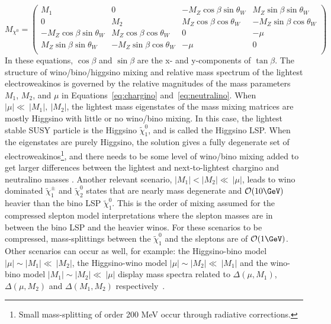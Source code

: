 \begin{equation}
M_{\chi^0}=
\begin{pmatrix}
M_1 & 0 & -M_Z\cos\beta \sin\theta_W & M_Z\sin\beta \sin\theta_W\\
0 & M_2 & M_Z\cos\beta \cos\theta_W & -M_Z\sin\beta \cos\theta_W\\
-M_Z\cos\beta \sin\theta_W & M_Z\cos\beta \cos\theta_W & 0 & -\mu \\
M_Z\sin\beta \sin\theta_W & -M_Z\sin\beta \cos\theta_W & -\mu & 0 \\
\end{pmatrix}
\label{eq:neutralino}
\end{equation}
In these equations, $\cos\beta$ and $\sin\beta$ are the x- and y-components of $\tan\beta$.  The structure of wino/bino/higgsino mixing and relative mass spectrum of the lightest electroweakinos is governed by the relative magnitudes of the mass parameters $M_1$, $M_2$, and $\mu$ in Equations~\ref{eq:chargino} and~\ref{eq:neutralino}.  When $|\mu|\ll~|M_1|,~|M_2|$, the lightest mass eigenstates of the mass mixing matrices are mostly Higgsino with little or no wino/bino mixing.  In this case, the lightest stable SUSY particle is the Higgsino $\tilde\chi_1^0$, and is called the Higgsino LSP.  When the eigenstates are purely Higgsino, the solution gives a fully degenerate set of electroweakinos\footnote{Small mass-splitting of order 200 MeV occur through radiative corrections.}, and there needs to be some level of wino/bino mixing added to get larger differences between the lightest and next-to-lightest chargino and neutralino masses \cite{PhysRevD.93.063525}.  Another relevant scenario, $|M_1| <|M_2|\ll~|\mu|$, leads to wino dominated $\tilde\chi_1^\pm$ and $\tilde\chi_2^0$ states that are nearly mass degenerate and $\mathcal{O}(10\GeV)$ heavier than the bino LSP $\tilde\chi_1^0$.  This is the order of mixing assumed for the compressed slepton model interpretations where the slepton masses are in between the bino LSP and the heavier winos.  For these scenarios to be compressed, mass-splittings between the $\tilde\chi_1^0$ and the sleptons are of $\mathcal{O}(1\GeV)$.  Other scenarios can occur as well, for example: the Higgsino-bino model $|\mu|\sim |M_1|\ll~|M_2|$, the Higgsino-wino model $|\mu|\sim |M_2|\ll~|M_1|$ and the wino-bino model $|M_1|\sim |M_2|\ll~|\mu|$ display mass spectra related to $\Delta(\mu, M_1)$, $\Delta(\mu, M_2)$ and $\Delta(M_1, M_2)$ respectively~\cite{PhysRevD.96.055018}.  


